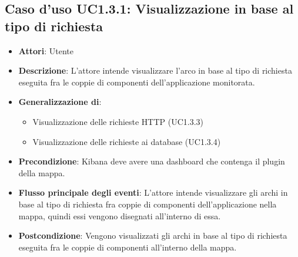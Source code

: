 \subsection{Caso d'uso UC1.3.1: Visualizzazione in base al tipo di richiesta}
\begin{itemize}
	\item \textbf{Attori}: Utente
	\item \textbf{Descrizione}: L'attore intende visualizzare l'arco in base al tipo di richiesta eseguita fra le coppie di componenti dell'applicazione monitorata.
	\item 	\textbf{Generalizzazione di}:
	\begin{itemize}
		\item Visualizzazione delle richieste HTTP (UC1.3.3)
		\item Visualizzazione delle richieste ai database (UC1.3.4)
	\end{itemize}
	\item \textbf{Precondizione}: Kibana deve avere una dashboard che contenga il plugin della mappa.
	\item \textbf{Flusso principale degli eventi}: L'attore intende visualizzare gli archi in base al tipo di richiesta fra coppie di componenti dell'applicazione nella mappa, quindi essi vengono disegnati all'interno di essa.
	\item \textbf{Postcondizione}: Vengono visualizzati gli archi in base al tipo di richiesta eseguita fra le coppie di componenti all'interno della mappa.
\end{itemize}
